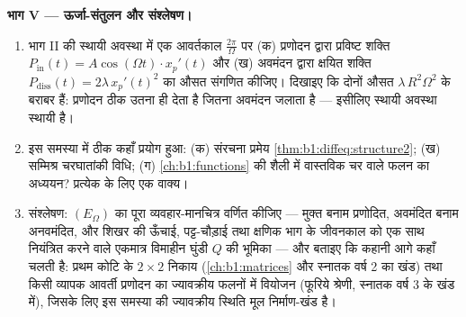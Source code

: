 \begin{problem}
\medskip \noindent\textbf{भाग V --- ऊर्जा-संतुलन और संश्लेषण।}
\begin{enumerate}[resume]
  \item भाग II की स्थायी अवस्था में एक आवर्तकाल $\frac{2\pi}\Omega$ पर (क)
  प्रणोदन द्वारा प्रविष्ट शक्ति $P_{\mathrm{in}}(t) = A\cos(\Omega t) \cdot
  x_p'(t)$ और (ख) अवमंदन द्वारा क्षयित शक्ति $P_{\mathrm{diss}}(t) =
  2\lambda\,x_p'(t)^2$ का औसत संगणित कीजिए। दिखाइए कि दोनों औसत
  $\lambda\,R^2\Omega^2$ के बराबर हैं: प्रणोदन ठीक उतना ही देता है जितना
  अवमंदन जलाता है --- इसीलिए स्थायी अवस्था स्थायी है।
  \item इस समस्या में ठीक कहाँ प्रयोग हुआ: (क) संरचना प्रमेय
  \cref{thm:b1:diffeq:structure2}; (ख) सम्मिश्र चरघातांकी विधि; (ग)
  \cref{ch:b1:functions} की शैली में वास्तविक चर वाले फलन का अध्ययन?
  प्रत्येक के लिए एक वाक्य।
  \item संश्लेषण: $(E_\Omega)$ का पूरा व्यवहार-मानचित्र वर्णित कीजिए ---
  मुक्त बनाम प्रणोदित, अवमंदित बनाम अनवमंदित, और शिखर की ऊँचाई, पट्ट-चौड़ाई
  तथा क्षणिक भाग के जीवनकाल को एक साथ नियंत्रित करने वाले एकमात्र विमाहीन
  घुंडी $Q$ की भूमिका --- और बताइए कि कहानी आगे कहाँ चलती है: प्रथम कोटि के
  $2 \times 2$ निकाय (\cref{ch:b1:matrices} और स्नातक वर्ष 2 का खंड) तथा
  किसी व्यापक आवर्ती प्रणोदन का ज्यावक्रीय फलनों में वियोजन (फूरिये श्रेणी,
  स्नातक वर्ष 3 के खंड में), जिसके लिए इस समस्या की ज्यावक्रीय स्थिति मूल
  निर्माण-खंड है।
\end{enumerate}
\end{problem}
